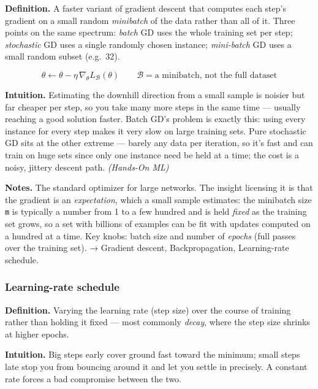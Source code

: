 \documentclass[
  10pt,
  letterpaper,
  onecolumn]{article}
\begin{document}
\textbf{Definition.} A faster variant of gradient descent that computes
each step's gradient on a small random \emph{minibatch} of the data
rather than all of it. Three points on the same spectrum: \emph{batch}
GD uses the whole training set per step; \emph{stochastic} GD uses a
single randomly chosen instance; \emph{mini-batch} GD uses a small
random subset (e.g.~32).

\begin{equation*}
\theta\leftarrow\theta-\eta\,\nabla_\theta L_{\mathcal B}(\theta)
\qquad \mathcal B=\text{a minibatch, not the full dataset}
\end{equation*}

\textbf{Intuition.} Estimating the downhill direction from a small
sample is noisier but far cheaper per step, so you take many more steps
in the same time --- usually reaching a good solution faster. Batch GD's
problem is exactly this: using every instance for every step makes it
very slow on large training sets. Pure stochastic GD sits at the other
extreme --- barely any data per iteration, so it's fast and can train on
huge sets since only one instance need be held at a time; the cost is a
noisy, jittery descent path. \emph{(Hands-On ML)}

\textbf{Notes.} The standard optimizer for large networks. The insight
licensing it is that the gradient is an \emph{expectation}, which a
small sample estimates: the minibatch size \texttt{m} is typically a
number from 1 to a few hundred and is held \emph{fixed} as the training
set grows, so a set with billions of examples can be fit with updates
computed on a hundred at a time. Key knobs:
batch size and number of \emph{epochs} (full passes over the training
set). → Gradient descent, Backpropagation, Learning-rate schedule.

\hypertarget{learning-rate-schedule}{%
\subsubsection{Learning-rate schedule}\label{learning-rate-schedule}}

\textbf{Definition.} Varying the learning rate (step size) over the
course of training rather than holding it fixed --- most commonly
\emph{decay}, where the step size shrinks at higher epochs.

\textbf{Intuition.} Big steps early cover ground fast toward the
minimum; small steps late stop you from bouncing around it and let you
settle in precisely. A constant rate forces a bad compromise between the
two.
\end{document}
